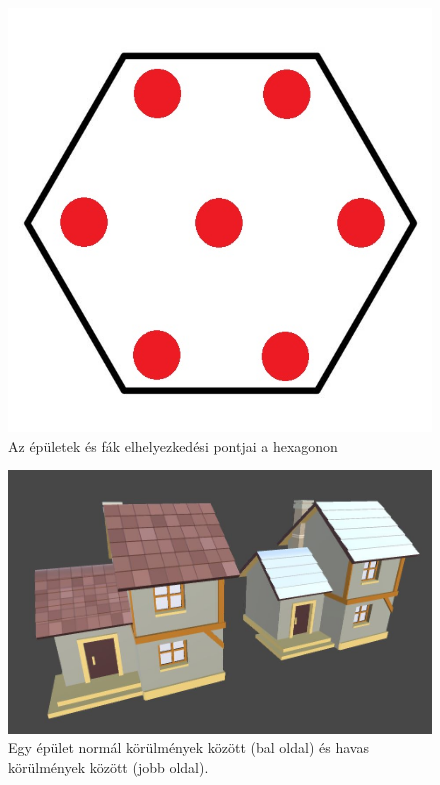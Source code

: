 \begin{figure}[h]
\centering
\includegraphics[scale=1.0]{kepek/img11_4_6_1.jpg}
\caption{Az épületek és fák elhelyezkedési pontjai a hexagonon}
\label{fig:img11_4_6_1}
\end{figure}

\begin{figure}[h]
\centering
\includegraphics[scale=0.4]{kepek/img11_4_6_2.JPG}
\caption{Egy épület normál körülmények között (bal oldal) és havas körülmények között (jobb oldal).}
\label{fig:img11_4_6_2}
\end{figure}

